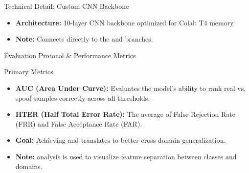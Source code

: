 \begin{frame}{Technical Detail: Custom CNN Backbone}
    \centering
    \vfill
    \begin{itemize}
        \item \textbf{Architecture:} 10-layer CNN backbone optimized for Colab T4 memory.
        \item \textbf{Note:} Connects directly to the  and  branches.
    \end{itemize}
\end{frame}

\begin{frame}{Evaluation Protocol \& Performance Metrics}
    \begin{block}{Primary Metrics}
        \begin{itemize}
            \item \textbf{AUC (Area Under Curve):} Evaluates the model's ability to rank real vs. spoof samples correctly across all thresholds.
            \item \textbf{HTER (Half Total Error Rate):} The average of False Rejection Rate (FRR) and False Acceptance Rate (FAR).
        \end{itemize}
    \end{block}

    \vfill
    \begin{itemize}
        \item \textbf{Goal:} Achieving  and  translates to better cross-domain generalization.
        \item \textbf{Note:}  analysis is used to visualize feature separation between classes and domains.
    \end{itemize}
\end{frame}


